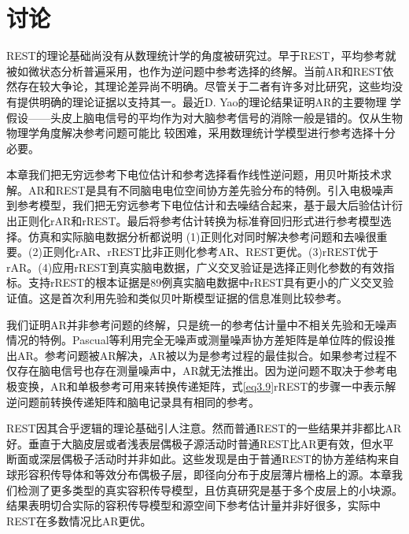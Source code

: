 \section{讨论}
REST的理论基础尚没有从数理统计学的角度被研究过。早于REST，平均参考就被如微状态分析普遍采用，也作为逆问题中参考选择的终解。当前AR和REST依然存在较大争论，其理论差异尚不明确。尽管关于二者有许多对比研究，这些均没有提供明确的理论证据以支持其一。最近D. Yao的理论结果证明AR的主要物理
学假设——头皮上脑电信号的平均作为对大脑参考信号的消除一般是错的。仅从生物物理学角度解决参考问题可能比
较困难，采用数理统计学模型进行参考选择十分必要。

本章我们把无穷远参考下电位估计和参考选择看作线性逆问题，用贝叶斯技术求解。AR和REST是具有不同脑电电位空间协方差先验分布的特例。引入电极噪声到参考模型，我们把无穷远参考下电位估计和去噪结合起来，基于最大后验估计衍出正则化rAR和rREST。最后将参考估计转换为标准脊回归形式进行参考模型选择。仿真和实际脑电数据分析都说明 (1)正则化对同时解决参考问题和去噪很重要。(2)正则化rAR、rREST比非正则化参考AR、REST更优。(3)rREST优于rAR。(4)应用rREST到真实脑电数据，广义交叉验证是选择正则化参数的有效指标。支持rREST的根本证据是89例真实脑电数据中rREST具有更小的广义交叉验证值。这是首次利用先验和类似贝叶斯模型证据的信息准则比较参考。

我们证明AR并非参考问题的终解，只是统一的参考估计量中不相关先验和无噪声情况的特例。Pascual等利用完全无噪声或测量噪声协方差矩阵是单位阵的假设推出AR。参考问题被AR解决，AR被以为是参考过程的最佳拟合。如果参考过程不仅存在脑电信号也存在测量噪声中，AR就无法推出。因为逆问题不取决于参考电极变换，AR和单极参考可用来转换传递矩阵，式\eqref{eq3.9}rREST的步骤一中表示解逆问题前转换传递矩阵和脑电记录具有相同的参考。

REST因其合乎逻辑的理论基础引人注意。然而普通REST的一些结果并非都比AR好。垂直于大脑皮层或者浅表层偶极子源活动时普通REST比AR更有效，但水平断面或深层偶极子活动时并非如此。这些发现是由于普通REST的协方差结构来自球形容积传导体和等效分布偶极子层，即径向分布于皮层薄片栅格上的源。本章我们检测了更多类型的真实容积传导模型，且仿真研究是基于多个皮层上的小块源。结果表明切合实际的容积传导模型和源空间下参考估计量并非好很多，实际中REST在多数情况比AR更优。

